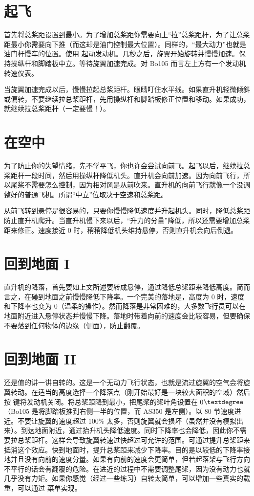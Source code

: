 
\section{起飞}

首先将总桨距设置到最小。为了增加总桨距你需要向上“拉”总桨距杆，为了让总桨距最小你需要向下推（而这却是油门控制最大位置）。同样的，“最大动力”也就是油门杆慢车的位置。使用 \key{\}} 起动发动机。几秒之后，旋翼开始旋转并慢慢加速。保持操纵杆和脚踏板中立。等待旋翼加速完成。对 Bo105 而言左上方有一个发动机转速仪表。

当旋翼加速完成以后，慢慢拉起总桨距杆。眼睛叮住水平线。如果直升机轻微倾斜或偏转，不要继续拉总桨距杆，先用操纵杆和脚踏板修正位置和移动。如果成功，就继续拉总桨距杆（一定要慢！）。

\section{在空中}

为了防止你的失望情绪，先不学平飞，你也许会尝试向前飞。起飞以后，继续拉总桨距杆一段时间，然后用操纵杆降低机头。直升机会向前加速。因为向前飞行，所以尾桨不需要怎么控制，因为相对风是从前吹来。直升机的向前飞行就像一个没调整好的普通飞机。所谓“中立”位取决于空速和总桨距。

从前飞转到悬停是很容易的，只要你慢慢降低速度并升起机头。同时，降低总桨距防止直升机爬升。当直升机慢下来以后，“升力的分量”降低，所以还需要增加总桨距来修正。速度接近 0 时，稍稍降低机头维持悬停，否则直升机会向后倒退。

\section{回到地面 I}

直升机的降落，首先要如上文所述要转成悬停，通过降低总桨距来降低高度。简而言之，在碰到地面之前慢慢降低下降率。一个完美的落地是，高度为 0 时，速度和下降率也变为 0（温柔的操作）。然而降落是非常困难的，大多数飞行员可以在地面附近进入悬停状态并慢慢下降。落地时带着向前的速度会比较容易，但要确保不要落到任何物体的边缘（侧面），防止翻覆。


\section{回到地面 II}

还是值的讲一讲自转的。这是一个无动力飞行状态，也就是流过旋翼的空气会将旋翼转动。在适当的高度选择一个降落点（刚开始最好是一块较大面积的空域）然后按 \key{\{} 键将发动机关闭。将总桨距降到最小，把尾桨的桨叶角设置在 0$\textdegree$（Bo105 是将脚踏板推到右侧一半的位置，而 AS350 是左侧）。以 80 节速度进近。不要让旋翼的速度超过 100\% 太多，否则旋翼就会损坏（虽然并没有模拟出来）。到达地面附近，通过抬升机头降低速度。同时下降率也会降低，因此你不需要拉总桨距杆。这样会导致旋翼转速过快超过可允许的范围。可通过提升总桨距来抵消这个效应。快到地面时，提升总桨距来减少下降率。目的是以较低的下降率接地并且没有向前的速度分量。如果有向前的速度会更简单，但若起落架与飞行方向不平行的话会有翻覆的危险。在进近的过程中不需要调整尾桨，因为没有动力也就几乎没有力矩。如果你感觉（经过一些练习）自转太简单，可以增加一些真实的载重，可以通过  菜单实现。

